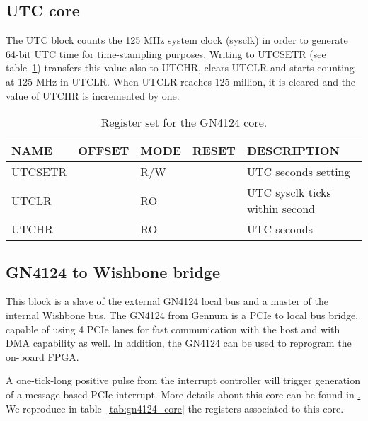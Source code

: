 \documentclass{article}
\begin{document}
\subsection{UTC core}
The UTC block counts the 125 MHz system clock (sysclk) in order to generate 64-bit UTC time for time-stampling purposes. Writing to UTCSETR (see table~\ref{tab:utc_core}) transfers this value also to UTCHR, clears UTCLR and starts counting at 125 MHz in UTCLR. When UTCLR reaches 125 million, it is cleared and the value of UTCHR is incremented by one.

\begin{table}[htbp]
  \centering
  \begin{tabularx}{\textwidth}{|l|r|l|l|X|}
    \hline
    \textbf{NAME} & \textbf{OFFSET} & \textbf{MODE} & \textbf{RESET} & \textbf{DESCRIPTION} \\
    \hline
    \hline
    UTCSETR & & R/W & & UTC seconds setting\\
    \hline
    UTCLR & & RO & & UTC sysclk ticks within second\\
    \hline
    UTCHR & & RO & & UTC seconds\\
    \hline
  \end{tabularx}
  \caption{Register set for the GN4124 core.}
  \label{tab:utc_core}
\end{table}

\subsection{GN4124 to Wishbone bridge}
\label{ssec:GN4124_WB}
This block is a slave of the external GN4124 local bus and a master of the internal Wishbone bus. The GN4124 from Gennum is a PCIe to local bus bridge, capable of using 4 PCIe lanes for fast communication with the host and with DMA capability as well. In addition, the GN4124 can be used to reprogram the on-board FPGA. 

A one-tick-long positive pulse from the interrupt controller will trigger generation of a message-based PCIe interrupt. More details about this core can be found in \href{http://www.ohwr.org/projects/gn4124-core/wiki}. We reproduce in table~\ref{tab:gn4124_core} the registers associated to this core. 
\end{document}
